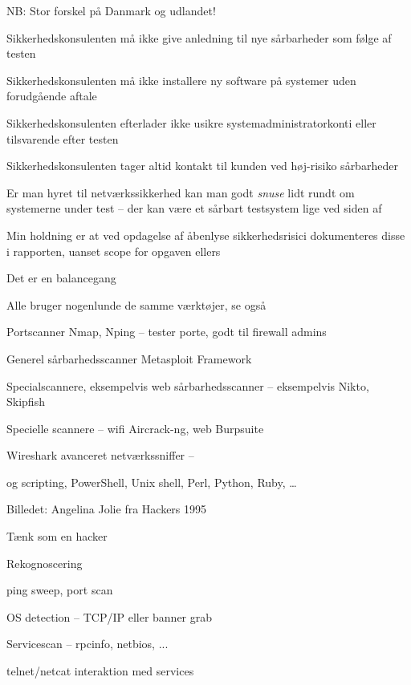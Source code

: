 \documentclass[20pt,landscape,a4paper,footrule]{foils}
\begin{document}
\begin{list2}
\item NB: Stor forskel på Danmark og udlandet!
\item Sikkerhedskonsulenten må ikke give anledning til nye sårbarheder
  som følge af testen
\item Sikkerhedskonsulenten må ikke installere ny software på
  systemer uden forudgående aftale
\item Sikkerhedskonsulenten efterlader ikke usikre
  systemadministratorkonti eller tilsvarende efter testen
\item Sikkerhedskonsulenten tager altid kontakt til kunden ved
  høj-risiko sårbarheder
\item Er man hyret til netværkssikkerhed kan man godt \emph{snuse}
  lidt rundt om systemerne under test -- der kan være et sårbart
  testsystem lige ved siden af
\item Min holdning er at ved opdagelse af åbenlyse sikkerhedsrisici
  dokumenteres disse i rapporten, uanset scope for opgaven ellers
\end{list2}

\centerline{Det er en balancegang}



\begin{list2}
\item Alle bruger nogenlunde de samme værktøjer, se også 
\item Portscanner Nmap, Nping -- tester porte, godt til firewall admins 
\item Generel sårbarhedsscanner Metasploit Framework 
\item Specialscannere, eksempelvis web sårbarhedsscanner -- eksempelvis Nikto, Skipfish
\item Specielle scannere -- wifi Aircrack-ng, web Burpsuite 
\item Wireshark avanceret netværkssniffer -- 
\item og scripting, PowerShell, Unix shell, Perl, Python, Ruby, \ldots
\end{list2}

Billedet: Angelina Jolie fra Hackers 1995



\begin{list1}
\item Tænk som en hacker
\item Rekognoscering
\begin{list2}
\item ping sweep, port scan
\item OS detection -- TCP/IP eller banner grab
\item Servicescan -- rpcinfo, netbios, ...
\item telnet/netcat interaktion med services
\end{list2}
\end{list1}
\end{document}
